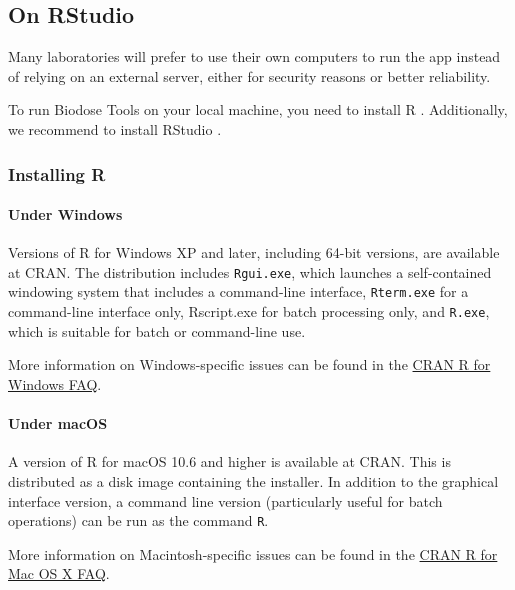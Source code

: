 \documentclass[]{scrartcl}
\let\oldparagraph\paragraph
\renewcommand{\paragraph}[1]{\oldparagraph{#1}\mbox{}}
\begin{document}
\hypertarget{manual-get-offline}{%
\subsection{On RStudio}\label{manual-get-offline}}

Many laboratories will prefer to use their own computers to run the app instead of relying on an external server, either for security reasons or better reliability.

To run Biodose Tools on your local machine, you need to install R \citep{R-base}. Additionally, we recommend to install RStudio \citep{R-Rstudio}.

\hypertarget{installing-r}{%
\subsubsection{Installing R}\label{installing-r}}

\hypertarget{under-windows}{%
\paragraph{Under Windows}\label{under-windows}}

Versions of R for Windows XP and later, including 64-bit versions, are available at CRAN. The distribution includes \texttt{Rgui.exe}, which launches a self-contained windowing system that includes a command-line interface, \texttt{Rterm.exe} for a command-line interface only, Rscript.exe for batch processing only, and \texttt{R.exe}, which is suitable for batch or command-line use.

More information on Windows-specific issues can be found in the \href{https://cloud.r-project.org/bin/windows/base/rw-FAQ.html}{CRAN R for Windows FAQ}.

\hypertarget{under-macos}{%
\paragraph{Under macOS}\label{under-macos}}

A version of R for macOS 10.6 and higher is available at CRAN. This is distributed as a disk image containing the installer. In addition to the graphical interface version, a command line version (particularly useful for batch operations) can be run as the command \texttt{R}.

More information on Macintosh-specific issues can be found in the \href{https://cloud.r-project.org/bin/macosx/RMacOSX-FAQ.html}{CRAN R for Mac OS X FAQ}.
\end{document}
